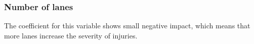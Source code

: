 \documentclass{article}
\begin{document}




\subsubsection{Number of lanes}

The coefficient for this variable shows small negative impact, which means that more lanes increase the severity of injuries.




\end{document}
